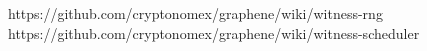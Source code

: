 https://github.com/cryptonomex/graphene/wiki/witness-rng
https://github.com/cryptonomex/graphene/wiki/witness-scheduler
